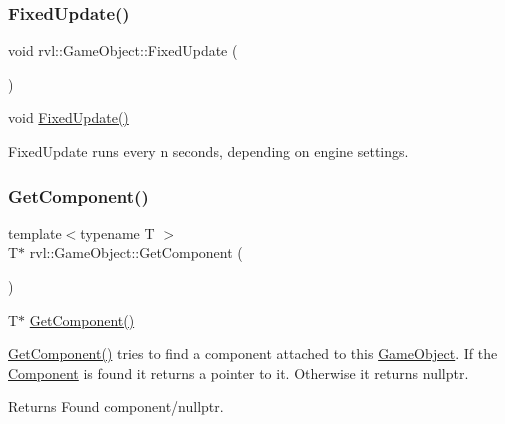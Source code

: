 \subsubsection{\texorpdfstring{Fixed\+Update()}{FixedUpdate()}}
{\footnotesize\ttfamily void rvl\+::\+Game\+Object\+::\+Fixed\+Update (\begin{DoxyParamCaption}{ }\end{DoxyParamCaption})}



void \hyperlink{classrvl_1_1_game_object_a275a49882a7d619adef9698fee03fdab}{Fixed\+Update()} 

Fixed\+Update runs every n seconds, depending on engine settings. \mbox{\label{classrvl_1_1_game_object_a27430c585db9256d39c8ece59cb76d16}} 
\subsubsection{\texorpdfstring{Get\+Component()}{GetComponent()}}
{\footnotesize\ttfamily template$<$typename T $>$ \\
T$\ast$ rvl\+::\+Game\+Object\+::\+Get\+Component (\begin{DoxyParamCaption}{ }\end{DoxyParamCaption})\hspace{0.3cm}{\ttfamily [inline]}}



T$\ast$ \hyperlink{classrvl_1_1_game_object_a27430c585db9256d39c8ece59cb76d16}{Get\+Component()} 

\hyperlink{classrvl_1_1_game_object_a27430c585db9256d39c8ece59cb76d16}{Get\+Component()} tries to find a component attached to this \hyperlink{classrvl_1_1_game_object}{Game\+Object}. If the \hyperlink{classrvl_1_1_component}{Component} is found it returns a pointer to it. Otherwise it returns nullptr.

\begin{DoxyReturn}{Returns}
Found component/nullptr. 
\end{DoxyReturn}
\mbox{\label{classrvl_1_1_game_object_aa03752d8c34914ee01c9e06d2bb661d0}} 
